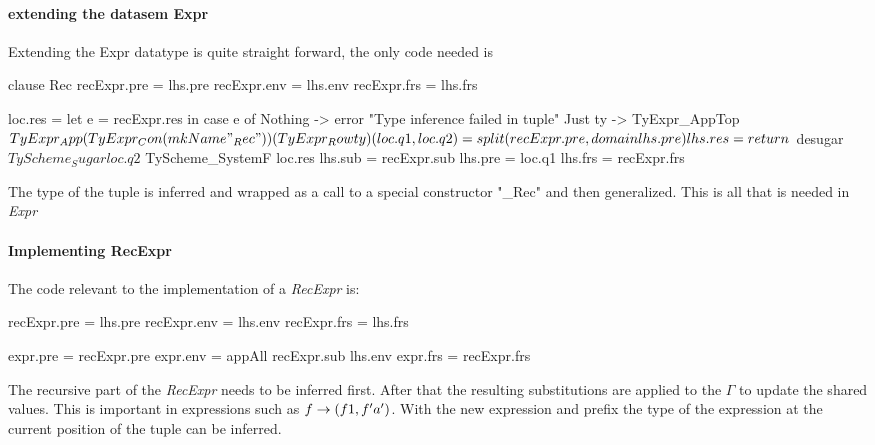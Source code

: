 \paragraph{extending the datasem Expr}
Extending the Expr datatype is quite straight forward, the only code needed is

\begin{code}
clause Rec
   recExpr.pre = lhs.pre
   recExpr.env = lhs.env
   recExpr.frs = lhs.frs
   
   loc.res = let e = recExpr.res
             in case e of
                  Nothing -> error "Type inference failed in tuple"
                  Just ty -> TyExpr_AppTop $
                                TyExpr_App
                                   (TyExpr_Con (mkName "_Rec"))
                                   (TyExpr_Row ty)
   
   (loc.q1, loc.q2) = split (recExpr.pre, domain lhs.pre)
   lhs.res = return $ desugar 
                    $ TyScheme_Sugar loc.q2 
                    $ TyScheme_SystemF loc.res
   lhs.sub = recExpr.sub
   lhs.pre = loc.q1
   lhs.frs = recExpr.frs
\end{code}
The type of the tuple is inferred and wrapped as a call to a special constructor "\_Rec" and then generalized. This is all that is needed in \emph{Expr}

\paragraph{Implementing RecExpr}
The code relevant to the implementation of a \emph{RecExpr} is:

\begin{code}
   recExpr.pre = lhs.pre
   recExpr.env = lhs.env
   recExpr.frs = lhs.frs
   
   expr.pre = recExpr.pre
   expr.env = appAll recExpr.sub lhs.env
   expr.frs = recExpr.frs
\end{code}
The recursive part of the \emph{RecExpr} needs to be inferred first. After that the resulting substitutions are applied to the $\Gamma$ to update the shared values. This is important in expressions such as $\\f \rightarrow (f 1, f 'a')$. With the new expression and prefix the type of the expression at the current position of the tuple can be inferred.

